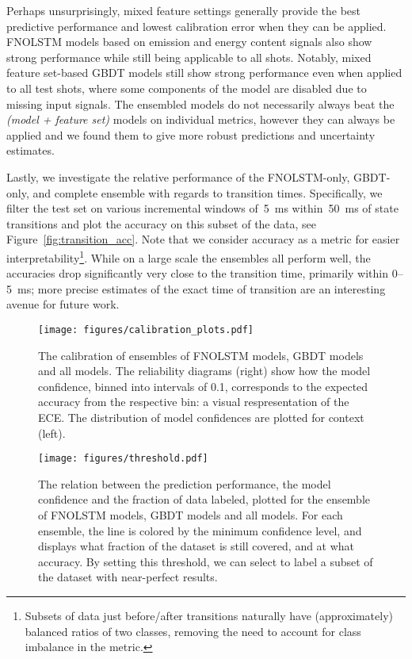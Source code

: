 Perhaps unsurprisingly, mixed feature settings generally provide the best predictive performance and lowest calibration error when they can be applied. FNOLSTM models based on emission and energy content signals also show strong performance while still being applicable to all shots. Notably, mixed feature set-based GBDT models still show strong performance even when applied to all test shots, where some components of the model are disabled due to missing input signals. The ensembled models do not necessarily always beat the \textit{(model + feature set)} models on individual metrics, however they can always be applied and we found them to give more robust predictions and uncertainty estimates.

Lastly, we investigate the relative performance of the FNOLSTM-only, GBDT-only, and complete ensemble with regards to transition times. Specifically, we filter the test set on various incremental windows of~\SI{5}{\milli\second} within~\SI{50}{\milli\second} of state transitions and plot the accuracy on this subset of the data, see Figure~\ref{fig:transition_acc}. Note that we consider accuracy as a metric for easier interpretability\footnote{Subsets of data just before/after transitions naturally have (approximately) balanced ratios of two classes, removing the need to account for class imbalance in the metric.}. While on a large scale the ensembles all perform well, the accuracies drop significantly very close to the transition time, primarily within \numrange{0}{5}\SI{}{\milli\second}; more precise estimates of the exact time of transition are an interesting avenue for future work.

\begin{figure}[t]
\begin{center}\texttt{[image: figures/calibration\_plots.pdf]}\end{center}
    \caption{The calibration of ensembles of FNOLSTM models, GBDT models and all models. The reliability diagrams (right) show how the model confidence, binned into intervals of 0.1, corresponds to the expected accuracy from the respective bin: a visual respresentation of the ECE. The distribution of model confidences are plotted for context (left).}
    \label{fig:calibration}%
\end{figure}

\begin{figure}[t]
\begin{center}\texttt{[image: figures/threshold.pdf]}\end{center}
    \caption{The relation between the prediction performance, the model confidence and the fraction of data labeled, plotted for the ensemble of FNOLSTM models, GBDT models and all models. For each ensemble, the line is colored by the minimum confidence level, and displays what fraction of the dataset is still covered, and at what accuracy. By setting this threshold, we can select to label a subset of the dataset with near-perfect results.}
    \label{fig:threshold}%
\end{figure}

